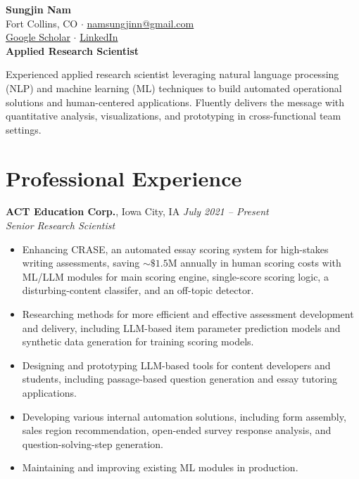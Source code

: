 \documentclass[11pt,a4paper]{article}
\begin{document}
\begin{center}
    {\Huge \textbf{Sungjin Nam}} \\ \vspace{4pt}
    Fort Collins, CO $\cdot$ \href{mailto:namsungjinn@gmail.com}{namsungjinn@gmail.com} \\
    \href{https://scholar.google.com/citations?user=aPLJxRwAAAAJ}{Google Scholar} 
    $\cdot$ \href{https://www.linkedin.com/in/sungjin-nam-661a1347/}{LinkedIn}
    \\ \vspace{6pt}
    {\large \textbf{Applied Research Scientist}} \\
\end{center}

\vspace{0.5ex}

Experienced applied research scientist leveraging natural language processing (NLP) and machine learning (ML) techniques to build automated operational solutions and human-centered applications.
Fluently delivers the message with quantitative analysis, visualizations, and prototyping in cross-functional team settings.

\section*{Professional Experience}

\textbf{ACT Education Corp.}, Iowa City, IA \hfill \textit{July 2021 -- Present} \\
\textit{Senior Research Scientist}
\begin{itemize}
    \item Enhancing CRASE, an automated essay scoring system for high-stakes writing assessments, saving $\sim\$1.5$M annually in human scoring costs with ML/LLM modules for main scoring engine, single-score scoring logic, a disturbing-content classifer, and an off-topic detector.
    \item Researching methods for more efficient and effective assessment development and delivery, including LLM-based item parameter prediction models and synthetic data generation for training scoring models.
    \item Designing and prototyping LLM-based tools for content developers and students, including passage-based question generation and essay tutoring applications.
    \item Developing various internal automation solutions, including form assembly, sales region recommendation, open-ended survey response analysis, and question-solving-step generation.
    \item Maintaining and improving existing ML modules in production.
\end{itemize}
\end{document}
